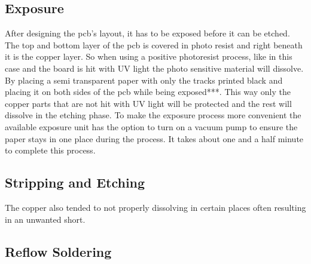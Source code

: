 \subsection{Exposure}

After designing the \gls{pcb}'s layout, it has to be exposed before it can be etched. The top and bottom layer of the \gls{pcb} is covered in photo resist and right beneath it is the copper layer. So when using a positive photoresist process, like in this case and the board is hit with UV light the photo sensitive material will dissolve. By placing a semi transparent paper with only the tracks printed black and placing it on both sides of the \gls{pcb} while being exposed***. This way only the copper parts that are not hit with UV light will be protected and the rest will dissolve in the etching phase. To make the exposure process more convenient the available exposure unit has the option to turn on a vacuum pump to ensure the paper stays in one place during the process. It takes about one and a half minute to complete this process.

\subsection{Stripping and Etching}


The copper also tended to not properly dissolving in certain places often resulting in an unwanted short. 

\subsection{Reflow Soldering}